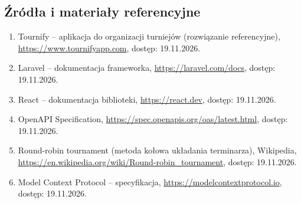 \documentclass[11pt,a4paper,oneside]{article}
\newif\ifpodpowiedzi
\newcommand{\podpowiedz}[1]{\ifpodpowiedzi\par\begingroup\small\color{hintcolor}\textit{Wskazówka: #1}\par\endgroup\fi}
\begin{document}
\subsection{Źródła i materiały referencyjne}
\podpowiedz{Wskaż źródła wykorzystane przy opracowaniu koncepcji: dokumentację techniczną, publikacje, zbiory danych, zasoby i rozwiązania referencyjne. Dla stron internetowych podaj tytuł, adres i datę dostępu. Jeśli nie korzystano ze źródeł zewnętrznych, wpisz tę informację.}
\begin{enumerate}
\item Tournify -- aplikacja do organizacji turniejów (rozwiązanie referencyjne), \url{https://www.tournifyapp.com}, dostęp: 19.11.2026.
\item Laravel -- dokumentacja frameworka, \url{https://laravel.com/docs}, dostęp: 19.11.2026.
\item React -- dokumentacja biblioteki, \url{https://react.dev}, dostęp: 19.11.2026.
\item OpenAPI Specification, \url{https://spec.openapis.org/oas/latest.html}, dostęp: 19.11.2026.
\item Round-robin tournament (metoda kołowa układania terminarza), Wikipedia, \url{https://en.wikipedia.org/wiki/Round-robin_tournament}, dostęp: 19.11.2026.
\item Model Context Protocol -- specyfikacja, \url{https://modelcontextprotocol.io}, dostęp: 19.11.2026.
\end{enumerate}
\end{document}
